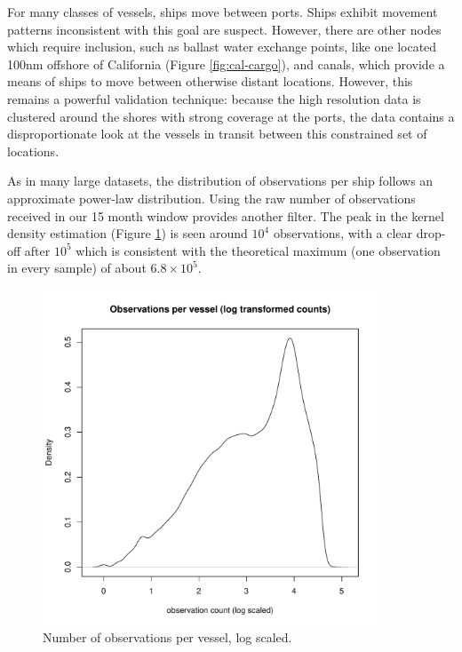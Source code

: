 \documentclass[12pt,letterpaper]{article}
\begin{document}
For many classes of vessels, ships move between ports. Ships exhibit movement patterns inconsistent with this goal are suspect. However, there are other nodes which require inclusion, such as ballast water exchange points, like one located 100nm offshore of California (Figure \ref{fig:cal-cargo}), and canals, which provide a means of ships to move between otherwise distant locations. However, this remains a powerful validation technique: because the high resolution data is clustered around the shores with strong coverage at the ports, the data contains a disproportionate look at the vessels in transit between this constrained set of locations.

As in many large datasets, the distribution of observations per ship follows an approximate power-law distribution. Using the raw number of observations received in our 15 month window provides another filter. The peak in the kernel density estimation (Figure \ref{fig:obs-per-vessel-log}) is seen around $10^4$ observations, with a clear drop-off after $10^5$ which is consistent with the theoretical maximum (one observation in every sample) of about $6.8 \times 10^5$.

\begin{figure}[htbp]
  \centering
  \includegraphics[width=100mm]{figures/obs-per-vessel-log.pdf}
  \caption{Number of observations per vessel, log scaled.}
  \label{fig:obs-per-vessel-log}
\end{figure}


\end{document}
